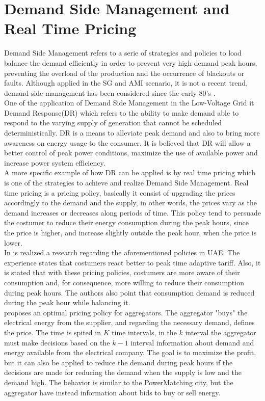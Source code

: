 \section{Demand Side Management and Real Time Pricing}
Demand Side Management refers to a serie of strategies and policies to load balance the demand efficiently in order to prevent very high demand peak hours, preventing the overload of the production and the occurrence of blackouts or faults. Although applied in the SG and AMI scenario, it is not a recent trend, demand side management has been considered since the early 80's \cite{samadi2010optimal}.\\
One of the application of Demand Side Management in the Low-Voltage Grid it Demand Response(DR) which refers to the ability to make demand able to respond to the varying supply of generation that cannot be scheduled deterministically. DR is  a means to alleviate peak demand and also to bring more awareness on energy usage to the consumer. It is believed that DR will allow a better control of peak power conditions, maximize the use of available power and increase power system efficiency.\\
A more specific example of how DR can be applied is by real time pricing which is one of the strategies to achieve and realize Demand Side Management. Real time pricing is a pricing policy, basically it consist of upgrading the prices accordingly to the demand and the supply, in other words, the prices vary as the demand increases or decreases along periods of time. This policy tend to persuade the costumer to reduce their energy consumption during the peak hours, since the price is higher, and increase slightly outside the peak hour, when the price is lower.\\
In \cite{taqqali2010smart} is realized a research regarding the aforementioned policies in UAE. The experience states that costumers react better to peak time adaptive tariff. Also, it is stated that with these pricing policies, costumers are more aware of their consumption and, for consequence, more willing to reduce their consumption during peak hours. The authors also point that consumption demand is reduced during the peak hour while balancing it.\\
 \cite{lin2014designing} proposes an optimal pricing policy for aggregators. The aggregator "buys" the electrical energy from the supplier, and regarding the necessary demand, defines the price. The time is spited in $K$ time intervals, in the $k$ interval the aggregator must make decisions based on the $k-1$ interval information about demand and energy available from the electrical company. The goal is to maximize the profit, but it can also be applied to reduce the demand during peak hours if the decisions are made for reducing the demand when the supply is low and the demand high. The behavior is similar to the PowerMatching city, but the aggregator have instead information about bids to buy or sell energy. \\
